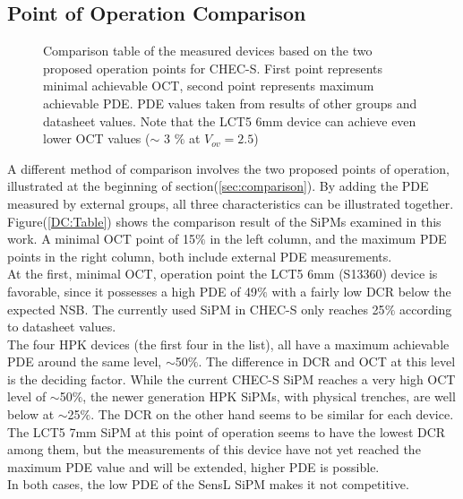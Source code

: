 \documentclass[12pt,article,type=msc,colorback,accentcolor=tud9c]{tudthesis}
\begin{document}
\subsection{Point of Operation Comparison}
\label{subsec:OP_comp}
\begin{figure}[h!]
\begin{centering}
\caption[Comparison based on two proposed points of operation]{Comparison table of the measured devices based on the two proposed operation points for CHEC-S. First point represents minimal achievable OCT, second point represents maximum achievable PDE. PDE values taken from results of other groups and datasheet values. Note that the LCT5 6mm device can achieve even lower OCT values ($\sim$ 3 $\%$ at $V_{ov}=2.5$)}
\label{fig:DC_Table}
\end{centering}
\end{figure}
A different method of comparison involves the two proposed points of operation, illustrated at the beginning of section(\ref{sec:comparison}). By adding the PDE measured by external groups, all three characteristics can be illustrated together. Figure(\ref{DC:Table}) shows the comparison result of the SiPMs examined in this work. A minimal OCT point of 15$\%$ in the left column, and the maximum PDE points in the right column, both include external PDE measurements.\\
At the first, minimal OCT, operation point the LCT5 6mm (S13360) device is favorable, since it possesses a high PDE of 49$\%$ with a fairly low DCR below the expected NSB. The currently used SiPM in CHEC-S only reaches 25$\%$ according to datasheet values.\\
The four HPK devices (the first four in the list), all have a maximum achievable PDE around the same level, $\sim$50$\%$. The difference in DCR and OCT at this level is the deciding factor. While the current CHEC-S SiPM reaches a very high OCT level of $\sim$50$\%$, the newer generation HPK SiPMs, with physical trenches, are well below at $\sim$25$\%$. The DCR on the other hand seems to be similar for each device. The LCT5 7mm SiPM at this point of operation seems to have the lowest DCR among them, but the measurements of this device have not yet reached the maximum PDE value and will be extended, higher PDE is possible.\\
In both cases, the low PDE of the SensL SiPM makes it not competitive.  
\end{document}
